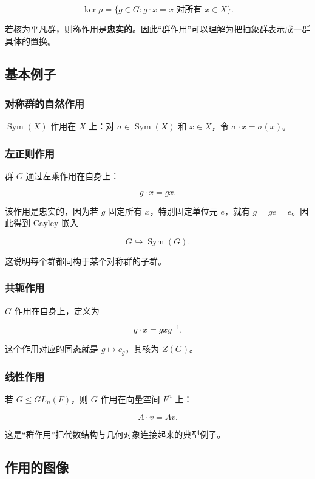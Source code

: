 \[
\ker\rho=\{g\in G:g\cdot x=x\text{ 对所有 }x\in X\}.
\]

若核为平凡群，则称作用是\textbf{忠实的}。因此“群作用”可以理解为把抽象群表示成一群具体的置换。

\subsection{基本例子}


\subsubsection{对称群的自然作用}


$\operatorname{Sym}(X)$ 作用在 $X$ 上：对 $\sigma\in\operatorname{Sym}(X)$ 和 $x\in X$，令 $\sigma\cdot x=\sigma(x)$。

\subsubsection{左正则作用}


群 $G$ 通过左乘作用在自身上：

\[
 g\cdot x=gx.
\]

该作用是忠实的，因为若 $g$ 固定所有 $x$，特别固定单位元 $e$，就有 $g=ge=e$。因此得到 Cayley 嵌入

\[
G\hookrightarrow\operatorname{Sym}(G).
\]

这说明每个群都同构于某个对称群的子群。

\subsubsection{共轭作用}


$G$ 作用在自身上，定义为

\[
 g\cdot x=gxg^{-1}.
\]

这个作用对应的同态就是 $g\mapsto c_g$，其核为 $Z(G)$。

\subsubsection{线性作用}


若 $G\le GL_n(F)$，则 $G$ 作用在向量空间 $F^n$ 上：

\[
 A\cdot v=Av.
\]

这是“群作用”把代数结构与几何对象连接起来的典型例子。

\subsection{作用的图像}


